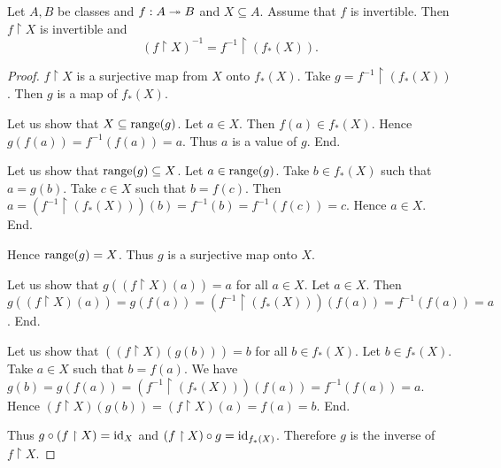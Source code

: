 \documentclass[../../set-theory/set-theory.tex]{subfiles}
\begin{document}
  \begin{forthel}
    \begin{proposition}
      Let $A, B$ be classes and $f : A \twoheadrightarrow B$ and $X \subseteq A$.
      Assume that $f$ is invertible.
      Then $f \restriction X$ is invertible and
      \[ (f\restriction X)^{-1} = f^{-1} \restriction (f_{*}(X)). \]
    \end{proposition}
    \begin{proof}
      $f \restriction X$ is a surjective map from $X$ onto $f_{*}(X)$.
      Take $g = f^{-1} \restriction (f_{*}(X))$.
      Then $g$ is a map of $f_{*}(X)$.

      Let us show that $X \subseteq \operatorname{range}(g)$.
        Let $a \in X$.
        Then $f(a) \in f_{*}(X)$.
        Hence $g(f(a)) = f^{-1}(f(a)) = a$.
        Thus $a$ is a value of $g$.
      End.

      Let us show that $\operatorname{range}(g) \subseteq X$.
        Let $a \in \operatorname{range}(g)$.
        Take $b \in f_{*}(X)$ such that $a = g(b)$.
        Take $c \in X$ such that $b = f(c)$.
        Then $a
          = (f^{-1} \restriction (f_{*}(X)))(b)
          = f^{-1}(b)
          = f^{-1}(f(c))
          = c$.
        Hence $a \in X$.
      End.

      Hence $\operatorname{range}(g) = X$.
      Thus $g$ is a surjective map onto $X$.

      Let us show that $g((f \restriction X)(a)) = a$ for all $a \in X$.
        Let $a \in X$.
        Then $g((f \restriction X)(a))
          = g(f(a))
          = (f^{-1} \restriction (f_{*}(X)))(f(a))
          = f^{-1}(f(a))
          = a$.
      End.

      Let us show that $((f \restriction X)(g(b))) = b$ for all $b \in f_{*}(X)$.
        Let $b \in f_{*}(X)$.
        Take $a \in X$ such that $b = f(a)$.
        We have $g(b)
          = g(f(a))
          = (f^{-1} \restriction (f_{*}(X)))(f(a))
          = f^{-1}(f(a))
          = a$.
        Hence $(f \restriction X)(g(b))
          = (f \restriction X)(a)
          = f(a)
          = b$.
      End.

      Thus $g \circ (f \restriction X) = \operatorname{id}_{X}$ and
      $(f \restriction X) \circ g = \operatorname{id}_{f_{*}(X)}$.
      Therefore $g$ is the inverse of $f \restriction X$.
    \end{proof}
  \end{forthel}
\end{document}
